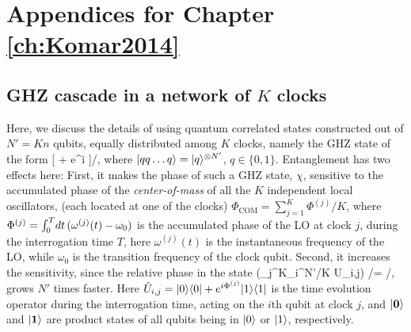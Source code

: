 \chapter{Appendices for Chapter \ref{ch:Komar2014}}
\label{app:Komar2014}



\section{GHZ cascade in a network of $K$ clocks}
\label{app:GHZ_cascade_in_network}
Here, we discuss the details of using quantum correlated
states constructed out of $N' = Kn$ qubits, equally distributed among $K$
clocks, namely the GHZ state of the form
\bel
	\label{eq:GHZ}
	[ + e^{i\chi} ]/,
\eel
where $| qq\dots q \rangle = | q \rangle^{\otimes N'}$, $q\in\{0,1\}$. Entanglement has
two effects here: First, it makes the phase of such a GHZ state, $\chi$,
sensitive to the accumulated phase of the \emph{center-of-mass} of all the $K$
independent local oscillators, (each located at one of the clocks)
$\Phi_\mathrm{COM} =
\sum_{j=1}^K \Phi^{(j)} /K$, where $\Phi^{(j)} = \intop_0^T\d{t}
(\omega^{(j)}(t) - \omega_0)$ is the accumulated phase of the LO at clock $j$,
during the interrogation time $T$, here $\omega^{(j)}(t)$ is the instantaneous
frequency of the LO, while $\omega_0$ is the transition frequency of the clock
qubit. Second, it increases the sensitivity, since the relative phase in
the state
\bel
\label{eq:GHZ_evolved}
	\left(\prod_{j}^{K}\prod_i^{N'/K} \hat U_{i,j}\right) /= 
	/,
\eel
grows $N'$ times faster.
Here $\hat U_{i,j} = | 0 \rangle\langle 0 | + e^{i\Phi^{(j)}}| 1 \rangle\langle 1 |$ is the time
evolution operator during the interrogation time, acting on the $i$th qubit at
clock $j$, and $| \mathbf{0} \rangle$ and $| \mathbf{1} \rangle$ are product states of
all qubits being in $| 0 \rangle$ or $| 1 \rangle$, respectively.

